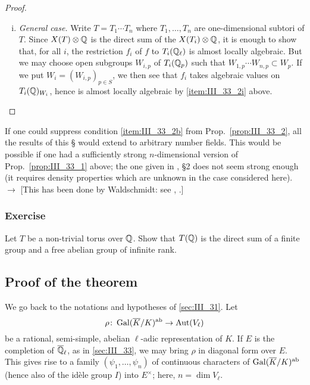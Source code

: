 \begin{proof}
\begin{enumerate}[i), wide]
\item \emph{General case.} Write $T = T_1 \cdots T_n$ where $T_1, \dots, T_n$
	are one-dimensional subtori of $T$. Since $X(T) \otimes \mathbb{Q}$ is the
	direct sum of the $X(T_i) \otimes \mathbb{Q}$, it is enough to show that, for
	all $i$, the restriction $f_i$ of $f$ to $T_i(\mathbb{Q}_\ell)$ is almost
	locally algebraic. But we may choose open subgroups $W_{i, p}$ of
	$T_i(\mathbb{Q}_p)$ such that $W_{1,p} \cdots W_{n,p} \subset W_p$. If we put
	$W_i = (W_{i,p})_{p\in S}$, we then see that $f_i$ takes algebraic
	values on $T_i(\mathbb{Q})_{W_i}$, hence is almost locally algebraic by
	\ref{item:III_33_2i} above. \qedhere
\end{enumerate}
\end{proof}

\begin{obs}
	If one could suppress condition \ref{item:III_33_2b} from
	Prop.~\ref{prop:III_33_2}, all the results of this \S{} would extend to
	arbitrary number fields. This would be possible if one had a
	sufficiently strong $n$-dimensional version of
	Prop.~\ref{prop:III_33_1} above; the one given in \cite{30}, \S 2 does
	not seem strong enough (it requires density properties which are
	unknown in the case considered here). $\to$ [This has been done by
	Waldschmidt: see \cite{63}, \cite{83}.]
\end{obs}

\subsubsection*{Exercise}
Let $T$ be a non-trivial torus over $\mathbb{Q}$. Show that $T(\mathbb{Q})$ is the direct sum
of a finite group and a free abelian group of infinite rank.

\dpage 

\subsection{Proof of the theorem}
\label{sec:III_34}

We go back to the notations and hypotheses of \ref{sec:III_31}. Let
\[
	\rho \colon \operatorname{Gal}(\overline{K}/K)^{\mathrm{ab}} \rightarrow \operatorname{Aut}(V_\ell)
\]
be a rational, semi-simple, abelian $\ell$-adic representation of $K$. If $E$ is
the completion of $\overline{\mathbb{Q}}_\ell$, as in \ref{sec:III_33}, we may bring 
$\rho$ in diagonal form over $E$. This gives rise to a family $(\psi_1,
\hdots,\psi_n)$ of continuous characters of $\operatorname{Gal}(\overline{K}/K)^{\mathrm{ab}}$ (hence
also of the idèle group $I$) into $E^\times$; here, $n = \dim V_\ell$.

